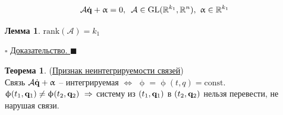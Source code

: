 \documentclass[specialist, subf, href, colorlinks=true, 12pt, times, mtpro, final]{disser}
\theoremstyle{definition}
\newtheorem{theorem}{Теорема}[section]
\newtheorem{lemma}{Лемма}[section]
\def\rk{\text{rank}}
\def\const{\text{const}}
\def\bfqd{\dot{\bfq}}
\def\bfalpha{\upalpha}
\def\bfphi{\upphi}
\begin{document}
    $$
    \mathcal{A}\bfqd+\bfalpha = 0,\,\,\, \mathcal{A}\in\text{GL}(\mathbb{R}^{k_1},\mathbb{R}^n),\,\,\bfalpha\in\mathbb{R}^{k_1}
    $$
    \begin{lemma} 
    $\rk(\mathcal{A}) = k_1$
    \end{lemma}
    \noindent$\square$ \hyperlink{first_lects.10}{ Доказательство. } $\blacksquare$
    \begin{theorem} (\hyperlink{first_lects.10}{Признак неинтегрируемости связей})\\
    Связь $\mathcal{A}\bfqd+\bfalpha$ -- интегрируемая $\Longleftrightarrow$
    $\bfphi=\bfphi(t,q)=\const$.\\
    $\bfphi(t_1,\bfq_1)\ne\bfphi(t_2,\bfq_2)\,\,\Rightarrow$ систему из $(t_1,\mathbf{q}_1)$ в
    $(t_2,\mathbf{q}_2)$ нельзя перевести, не нарушая связи.
    \end{theorem}
\end{document}
